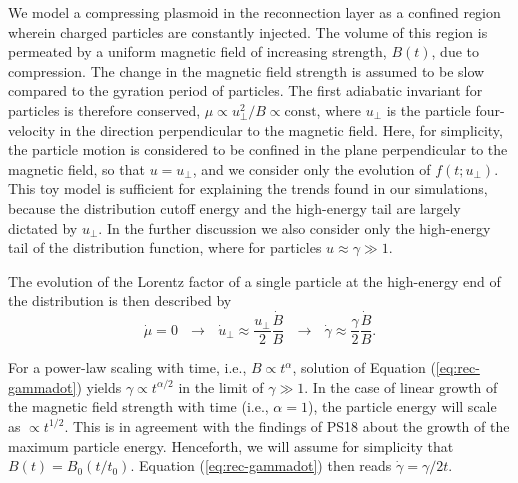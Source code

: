 We model a compressing plasmoid in the reconnection layer as a confined region wherein charged particles are constantly injected. The volume of this region is permeated by a uniform magnetic field of increasing strength, $B(t)$, due to compression. The change in the magnetic field strength is assumed to be slow compared to the gyration period of particles. The first adiabatic invariant for particles is therefore conserved, $\mu \propto u_{\perp}^2 / B \propto \mathrm{const}$, where $u_{\perp}$ is the particle four-velocity in the direction perpendicular to the magnetic field. Here, for simplicity, the particle motion is considered to be confined in the plane perpendicular to the magnetic field, so that $u = u_{\perp}$, and we consider only the evolution of $f(t;u_\perp)$. This toy model is sufficient for explaining the trends found in our simulations, because the distribution cutoff energy and the high-energy tail are largely dictated by $u_{\perp}$. In the further discussion we also consider only the high-energy tail of the distribution function, where for particles $u\approx \gamma \gg 1$.

The evolution of the Lorentz factor of a single particle at the high-energy end of the distribution is then described by
\begin{equation}
    \label{eq:rec-gammadot}
    \dot{\mu}=0~~~\rightarrow~~~\dot{u}_\perp\approx\frac{u_\perp}{2}\frac{\dot{B}}{B}~~~\rightarrow~~~\dot{\gamma}\approx\frac{\gamma}{2}\frac{\dot{B}}{B}.
\end{equation}

For a power-law scaling with time, i.e., $B\propto t^{\alpha}$, solution of Equation (\ref{eq:rec-gammadot}) yields $\gamma\propto t^{\alpha/2}$ in the limit of $\gamma\gg 1$. In the case of linear growth of the magnetic field strength with time (i.e., $\alpha=1$), the particle energy will scale as $\propto t^{1/2}$. This is in agreement with the findings of PS18 about the growth of the maximum particle energy. Henceforth, we will assume for simplicity that $B(t)=B_0 \left(t/t_0\right)$. Equation (\ref{eq:rec-gammadot}) then reads $\dot{\gamma}=\gamma/2t$.

